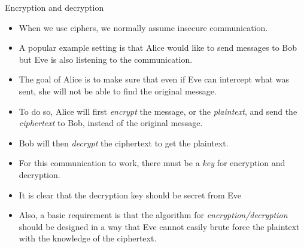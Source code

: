 \begin{frame}{Encryption and decryption}
    \begin{itemize}
        \item When we use ciphers, we normally assume insecure communication.
        \item A popular example setting is that Alice would like to send messages to Bob but Eve is also listening to the communication.
       \item The goal of Alice is to make sure that even if Eve can intercept what was sent, she will not be able to find the original message.
       \item To do so, Alice will first \textit{encrypt} the message, or the \textit{plaintext}, and send the \textit{ciphertext} to Bob, instead of the original message.
      \item Bob will then \textit{decrypt} the ciphertext to get the plaintext.
      \item For this communication to work, there must be a \textit{key} for encryption and decryption.
     \item It is clear that the decryption key should be secret from Eve
     \item Also, a basic requirement is that the algorithm for \textit{encryption/decryption} should be designed in a way that Eve cannot easily brute force the plaintext with the knowledge of the ciphertext.
    \end{itemize}
\end{frame}

